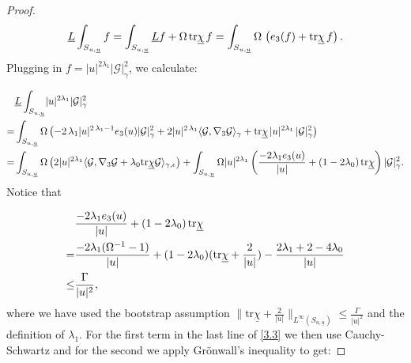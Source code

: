 \documentclass{amsart}
\newcommand{\Lbar}{\underline{L}}
\newcommand{\hsp}{\hspace{.5mm}}
\newcommand{\chibar}{\underline{\chi}}
\newcommand{\ubar}{\underline{u}}
\newcommand{\inftySu}[1]{\lVert{#1} \rVert_{L^{\infty}(S_{u,\ubar})}}
\newcommand{\tr}{\mbox{tr}}
\begin{document}
{\begin{proof}
\begin{equation}
\underline{L} \int_{S_{u,\ubar}} f = \int_{S_{u,\ubar}} \Lbar f + \Omega \hsp \tr\chibar \hsp f = \int_{S_{u,\ubar}} \Omega \hsp \left(e_3(f) + \tr\chibar \hsp f \right).
\end{equation}Plugging in $f= \lvert u \rvert^{2 \lambda_1} \lvert \mathcal{G} \rvert_{\gamma}^2$, we calculate:

\begin{equation}
\begin{split}
&\underline{L} \int_{S_{u,\ubar}}\lvert u \rvert^{2 \lambda_1} \lvert \mathcal{G} \rvert_{\gamma}^2 \\ = &\int_{S_{u,\ubar}} \Omega \left( -2 \hsp \lambda_1 \lvert u \rvert^{2 \hsp \lambda_1 -1} e_3(u) \lvert \mathcal{G} \rvert_{\gamma}^2 + 2 \lvert u \rvert^{2\hsp \lambda_1} \langle \mathcal{G}, \nabla_3 \mathcal{G} \rangle_{\gamma} + \tr\chibar \hsp \lvert u \rvert^{2\lambda_1}\hsp \lvert \mathcal{G} \rvert_{\gamma}^2 \right) \\ =& \int_{S_{u,\ubar}} \Omega \left( 2 \lvert u \rvert^{2\lambda_1} \langle \mathcal{G}, \nabla_3 \mathcal{G} + \lambda_0 \tr\chibar \mathcal{G} \rangle_{\gamma,\epsilon }\right) + \int_{S_{u,\ubar}} \Omega \lvert u \rvert^{2\lambda_1} \left( \frac{-2\lambda_1 e_3(u)}{\lvert u \rvert} + (1-2\lambda_0)\hsp \tr\chibar \right) \lvert \mathcal{G} \rvert_{\gamma}^2. \label{3.3}
\end{split}
\end{equation}Notice that

\begin{equation}
\begin{split}
&\frac{-2\lambda_1 e_3(u)}{\lvert u \rvert} + (1-2\lambda_0)\hsp \tr\chibar \\ = & \frac{-2\lambda_1 (\Omega^{-1}-1)}{\lvert u \rvert} +(1-2\lambda_0)(\tr\chibar + \frac{2}{\lvert u \rvert}) - \frac{2\lambda_1 + 2 - 4 \lambda_0}{\lvert u \rvert} \\ \leq& \frac{\Gamma}{\lvert u \rvert^2},
\end{split}
\end{equation}where we have used the bootstrap assumption $\inftySu{\tr\chibar + \frac{2}{\lvert u \rvert}} \leq\frac{\Gamma}{\lvert u \rvert^2}$ and the definition of $\lambda_1$. For the first term in the last line of \eqref{3.3} we then use Cauchy-Schwartz and for the second we apply Gr\"onwall's inequality to get:


\end{proof}}
\end{document}
